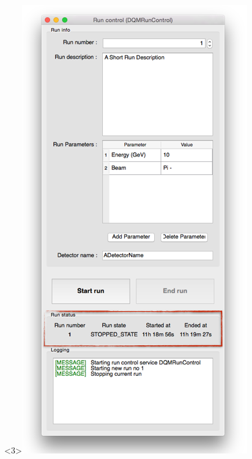 \documentclass[8pt]{beamer}
\begin{document}
\begin{frame}
\begin{center}
\begin{overlayarea}{\textwidth}{\textheight}
\begin{columns}
\begin{center}
          \begin{onlyenv}<3>\includegraphics[width=\textwidth]{figs/RunControl/RunControl_Status.png}\end{onlyenv}

\end{center}
\end{columns}
\end{overlayarea}
\end{center}
\end{frame}
\end{document}
